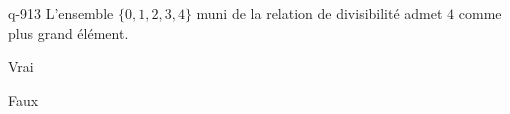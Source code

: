 \begin{truefalse}{q-913}
L'ensemble $\{0,1,2,3,4\}$ muni de la relation de divisibilité admet $4$ comme plus grand élément.
\item Vrai
\item* Faux
\end{truefalse}

